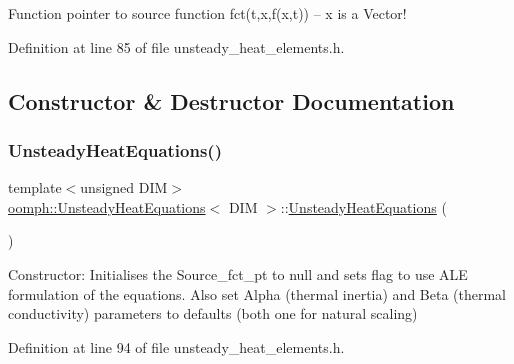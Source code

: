 Function pointer to source function fct(t,x,f(x,t)) -- x is a Vector! 



Definition at line 85 of file unsteady\+\_\+heat\+\_\+elements.\+h.



\subsection{Constructor \& Destructor Documentation}
\mbox{\label{classoomph_1_1UnsteadyHeatEquations_a773834143700adb827991fc25eb95f9d}} 
\subsubsection{\texorpdfstring{Unsteady\+Heat\+Equations()}{UnsteadyHeatEquations()}\hspace{0.1cm}{\footnotesize\ttfamily [1/2]}}
{\footnotesize\ttfamily template$<$unsigned D\+IM$>$ \\
\hyperlink{classoomph_1_1UnsteadyHeatEquations}{oomph\+::\+Unsteady\+Heat\+Equations}$<$ D\+IM $>$\+::\hyperlink{classoomph_1_1UnsteadyHeatEquations}{Unsteady\+Heat\+Equations} (\begin{DoxyParamCaption}{ }\end{DoxyParamCaption})\hspace{0.3cm}{\ttfamily [inline]}}



Constructor\+: Initialises the Source\+\_\+fct\+\_\+pt to null and sets flag to use A\+LE formulation of the equations. Also set Alpha (thermal inertia) and Beta (thermal conductivity) parameters to defaults (both one for natural scaling) 



Definition at line 94 of file unsteady\+\_\+heat\+\_\+elements.\+h.

\mbox{\label{classoomph_1_1UnsteadyHeatEquations_a440e40749643bf2ef3c06b086064502c}} 

